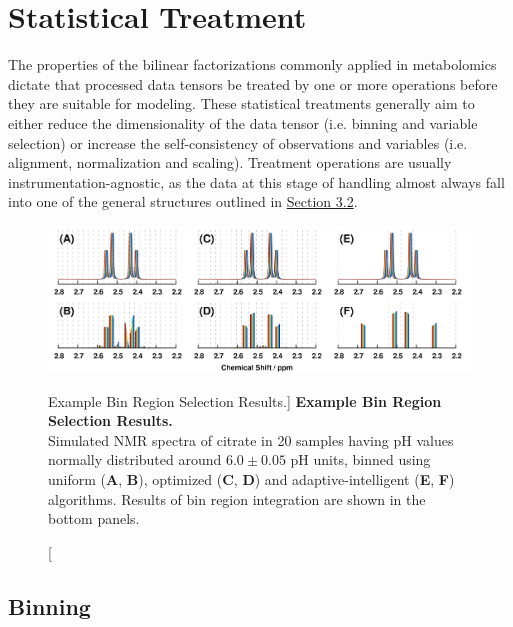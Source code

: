 \section{Statistical Treatment}

\begin{doublespace}
The properties of the bilinear factorizations commonly applied in metabolomics
dictate that processed data tensors be treated by one or more operations before
they are suitable for modeling. These statistical treatments generally aim to
either reduce the dimensionality of the data tensor (i.e. binning and variable
selection) or increase the self-consistency of observations and variables
(i.e. alignment, normalization and scaling). Treatment operations are usually
instrumentation-agnostic, as the data at this stage of handling almost always
fall into one of the general structures outlined in
\hyperlink{section.3.2}{Section 3.2}.
\end{doublespace}

\begin{figure}[ht!]
\includegraphics[width=6.5in]{figs/mva/05-binning.png}
\caption
      [Example Bin Region Selection Results.]{
  {\bf Example Bin Region Selection Results.}
  \\
  Simulated \hnmr{} NMR spectra of citrate in 20 samples having pH values
  normally distributed around $6.0 \pm 0.05$ pH units, binned using uniform
  ({\bf A}, {\bf B}), optimized ({\bf C}, {\bf D}) and adaptive-intelligent
  ({\bf E}, {\bf F}) algorithms. Results of bin region integration are shown
  in the bottom panels.
}
\end{figure}

\subsection{Binning}

